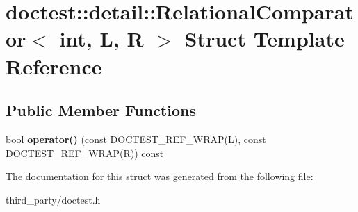 \hypertarget{structdoctest_1_1detail_1_1_relational_comparator}{}\section{doctest\+::detail\+::Relational\+Comparator$<$ int, L, R $>$ Struct Template Reference}
\label{structdoctest_1_1detail_1_1_relational_comparator}
\subsection*{Public Member Functions}
\begin{DoxyCompactItemize}
\item 
\mbox{\label{structdoctest_1_1detail_1_1_relational_comparator_a51062ad46cd23c982838a0a51df70512}} 
bool {\bfseries operator()} (const D\+O\+C\+T\+E\+S\+T\+\_\+\+R\+E\+F\+\_\+\+W\+R\+AP(L), const D\+O\+C\+T\+E\+S\+T\+\_\+\+R\+E\+F\+\_\+\+W\+R\+AP(R)) const
\end{DoxyCompactItemize}


The documentation for this struct was generated from the following file\+:\begin{DoxyCompactItemize}
\item 
third\+\_\+party/doctest.\+h\end{DoxyCompactItemize}
